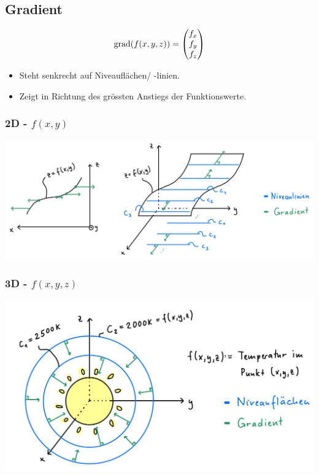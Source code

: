 \subsection{Gradient} 
    $$
        \mathrm{grad}(f(x,y,z)) = \begin{pmatrix}
            f_x \\ f_y \\ f_z
        \end{pmatrix}
    $$
    \begin{itemize}
        \item Steht senkrecht auf Niveauflächen/ -linien.
        \item Zeigt in Richtung des grössten Anstiegs der Funktionswerte.
    \end{itemize}
    \subsubsection{2D - \texorpdfstring{$f(x,y)$}{f(x,y)}}
        \includegraphics[width=\linewidth]{src/Mehrdimensionale-Funktionen_Differentialrechnung/Gradient 2D.jpg}
\cbreak 
    \subsubsection{3D - \texorpdfstring{$f(x,y,z)$}{f(x,y,z)}}
        \begin{center}
            \includegraphics[width=0.8\linewidth]{src/Mehrdimensionale-Funktionen_Differentialrechnung/Gradient 3D.jpg}
        \end{center}
        
\vspace{3pt}